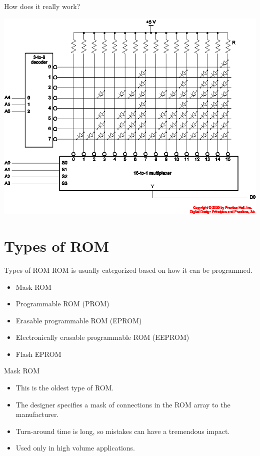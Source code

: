 \begin{frame}{How does it really work?}
  \begin{center}
    \includegraphics[scale=0.4]{ROMStructure}
  \end{center}
\end{frame}

\section{Types of ROM}

\begin{frame}{Types of ROM}
  ROM is usually categorized based on how it can be programmed.
  \begin{itemize}
    \item Mask ROM
    \item Programmable ROM (PROM)
    \item Erasable programmable ROM (EPROM)
    \item Electronically erasable programmable ROM (EEPROM)
    \item Flash EPROM
  \end{itemize}
\end{frame}

\begin{frame}{Mask ROM}
  \begin{itemize}
    \item This is the oldest type of ROM.
    \item The designer specifies a mask of connections in the ROM array to the manufacturer.
    \item Turn-around time is long, so mistakes can have a tremendous impact.
    \item Used only in high volume applications.
  \end{itemize}
\end{frame}

